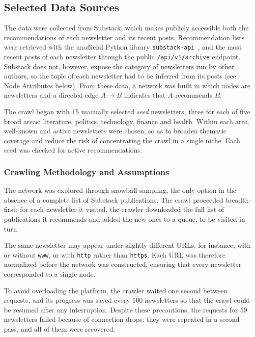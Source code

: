 \documentclass[sigchi]{acmart}
\begin{document}
\subsection{Selected Data Sources}

The data were collected from Substack, which makes publicly accessible
both the recommendations of each newsletter and its recent posts.
Recommendation lists were retrieved with the unofficial Python library
\texttt{substack-api}~\cite{substackapi}, and the most recent posts of each newsletter through the public \texttt{/api/v1/archive} endpoint. Substack does not, however, expose the category of newsletters run by other authors, so the topic of each newsletter had to be inferred from
its posts (see Node Attributes below). From these data, a network was built in which nodes are newsletters and a directed edge $A \to B$ indicates that $A$ recommends $B$.

The crawl began with 15 manually selected \emph{seed} newsletters, three
for each of five broad areas: literature, politics, technology, finance and health. Within each area, well-known and active newsletters were
chosen, so as to broaden thematic coverage and reduce the risk of
concentrating the crawl in a single niche. Each seed was checked for
active recommendations.

\subsubsection{Crawling Methodology and Assumptions}

The network was explored through snowball sampling, the only option in
the absence of a complete list of Substack publications. The crawl
proceeded breadth-first: for each newsletter it visited, the crawler
downloaded the full list of publications it recommends and added the
new ones to a queue, to be visited in turn.

The same newsletter may appear under slightly different URLs, for instance, with or without \texttt{www}, or with \texttt{http} rather than \texttt{https}. Each URL was therefore normalized before the network was constructed, ensuring that every newsletter corresponded to a single node.

To avoid overloading the platform, the crawler waited one second between
requests, and its progress was saved every 100 newsletters so that the
crawl could be resumed after any interruption. Despite these precautions,
the requests for 59 newsletters failed because of connection drops; they
were repeated in a second pass, and all of them were recovered. 
\end{document}
